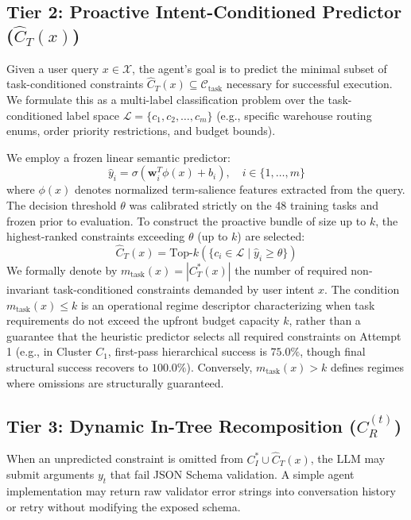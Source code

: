 \subsection{Tier 2: Proactive Intent-Conditioned Predictor ($\hat{C}_T(x)$)}
Given a user query $x \in \mathcal{X}$, the agent's goal is to predict the minimal subset of task-conditioned constraints $\hat{C}_T(x) \subseteq \mathcal{C}_{\text{task}}$ necessary for successful execution. We formulate this as a multi-label classification problem over the task-conditioned label space $\mathcal{L} = \{c_1, c_2, \dots, c_m\}$ (e.g., specific warehouse routing enums, order priority restrictions, and budget bounds).

We employ a frozen linear semantic predictor:
\begin{equation}
\hat{y}_i = \sigma\left( \mathbf{w}_i^T \phi(x) + b_i \right), \quad i \in \{1, \dots, m\}
\end{equation}
where $\phi(x)$ denotes normalized term-salience features extracted from the query. The decision threshold $\theta$ was calibrated strictly on the 48 training tasks and frozen prior to evaluation. To construct the proactive bundle of size up to $k$, the highest-ranked constraints exceeding $\theta$ (up to $k$) are selected:
\begin{equation}
\hat{C}_T(x) = \text{Top-}k \left( \{ c_i \in \mathcal{L} \mid \hat{y}_i \ge \theta \} \right)
\end{equation}
We formally denote by $m_{\text{task}}(x) = |C_T^*(x)|$ the number of required non-invariant task-conditioned constraints demanded by user intent $x$. The condition $m_{\text{task}}(x) \le k$ is an operational regime descriptor characterizing when task requirements do not exceed the upfront budget capacity $k$, rather than a guarantee that the heuristic predictor selects all required constraints on Attempt 1 (e.g., in Cluster $C_1$, first-pass hierarchical success is $75.0\%$, though final structural success recovers to $100.0\%$). Conversely, $m_{\text{task}}(x) > k$ defines regimes where omissions are structurally guaranteed.

\subsection{Tier 3: Dynamic In-Tree Recomposition ($C_R^{(t)}$)}
\label{sec:recomposition}
When an unpredicted constraint is omitted from $C_I^* \cup \hat{C}_T(x)$, the LLM may submit arguments $y_t$ that fail JSON Schema validation. A simple agent implementation may return raw validator error strings into conversation history or retry without modifying the exposed schema. 

